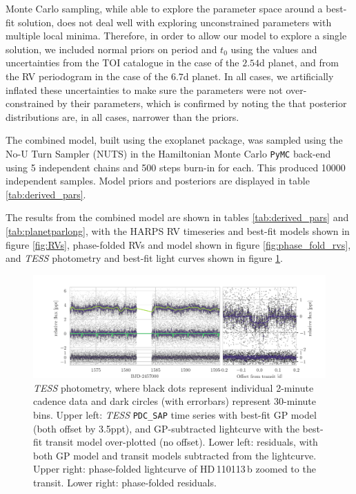 \documentclass[fleqn,usenatbib]{mnras}
\newcommand{\tess}{{\it TESS}}
\newcommand{\harps}{{HARPS}}
\newcommand{\Tplanet}{HD\,110113\,b}
\begin{document}
Monte Carlo sampling, while able to explore the parameter space around a best-fit solution, does not deal well with exploring unconstrained parameters with multiple local minima. 
Therefore, in order to allow our model to explore a single solution, we included normal priors on period and $t_0$ using the values and uncertainties from the TOI catalogue in the case of the $2.54$d planet, and from the RV periodogram in the case of the $6.7$d planet.
In all cases, we artificially inflated these uncertainties to make sure the parameters were not over-constrained by their parameters, which is confirmed by noting the that posterior distributions are, in all cases, narrower than the priors.

The combined model, built using the \textsf{exoplanet} \citep{exoplanet:exoplanet} package, was sampled using the No-U Turn Sampler (NUTS) in the Hamiltonian Monte Carlo \texttt{PyMC} back-end \citep{exoplanet:pymc3} using 5 independent chains and 500 steps burn-in for each.
This produced 10000 independent samples.
Model priors and posteriors are displayed in table \ref{tab:derived_pars}.

The results from the combined model are shown in tables \ref{tab:derived_pars} and \ref{tab:planetparlong}, with the \harps{} RV timeseries and best-fit models shown in figure \ref{fig:RVs}, phase-folded RVs and model shown in figure \ref{fig:phase_fold_rvs}, and \tess{} photometry and best-fit light curves shown in figure \ref{fig:photometry}.

\begin{figure}
	\includegraphics[width=\textwidth, trim={1.45cm 0.2 0.95cm 0.5}]{Combined_phot_plot_3_GPs_nontransiting_c.pdf}
    \caption{\tess{} photometry, where black dots represent individual 2-minute cadence data and dark circles (with errorbars) represent 30-minute bins. Upper left: \tess{} \texttt{PDC\_SAP} time series with best-fit GP model (both offset by 3.5ppt), and GP-subtracted lightcurve with the best-fit transit model over-plotted (no offset). Lower left: residuals, with both GP model and transit models subtracted from the lightcurve. Upper right: phase-folded lightcurve of \Tplanet{} zoomed to the transit. Lower right: phase-folded residuals. }
    \label{fig:photometry}
\end{figure}
\end{document}

